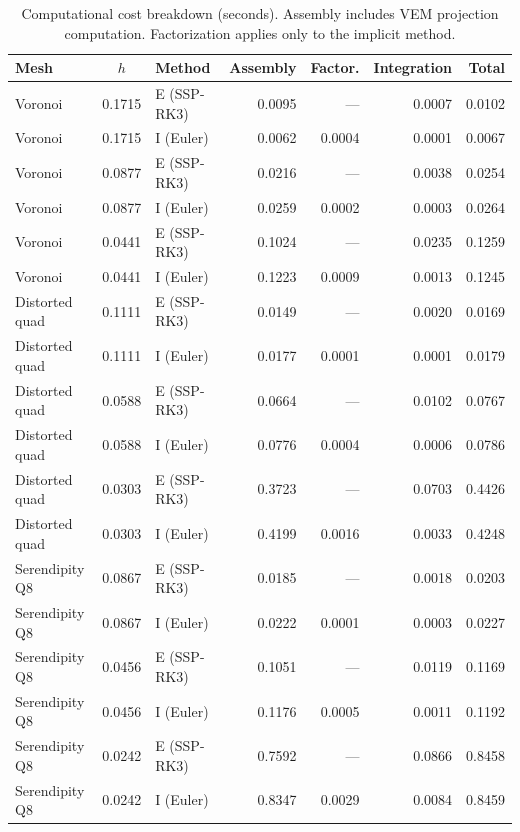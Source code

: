 \documentclass{article}
\begin{document}
\begin{table}[H]
    \centering
    \caption{Computational cost breakdown (seconds). Assembly includes VEM projection computation. Factorization applies only to the implicit method.}\label{tab:cost}
    \begin{tabular}{l c l r r r r}
    \toprule
    Mesh & $h$ & Method & Assembly & Factor. & Integration & Total \\
    \midrule
    Voronoi & 0.1715 & E (SSP-RK3) & 0.0095 & --- & 0.0007 & 0.0102 \\
    Voronoi & 0.1715 & I (Euler) & 0.0062 & 0.0004 & 0.0001 & 0.0067 \\
    Voronoi & 0.0877 & E (SSP-RK3) & 0.0216 & --- & 0.0038 & 0.0254 \\
    Voronoi & 0.0877 & I (Euler) & 0.0259 & 0.0002 & 0.0003 & 0.0264 \\
    Voronoi & 0.0441 & E (SSP-RK3) & 0.1024 & --- & 0.0235 & 0.1259 \\
    Voronoi & 0.0441 & I (Euler) & 0.1223 & 0.0009 & 0.0013 & 0.1245 \\
    \addlinespace
    Distorted quad & 0.1111 & E (SSP-RK3) & 0.0149 & --- & 0.0020 & 0.0169 \\
    Distorted quad & 0.1111 & I (Euler) & 0.0177 & 0.0001 & 0.0001 & 0.0179 \\
    Distorted quad & 0.0588 & E (SSP-RK3) & 0.0664 & --- & 0.0102 & 0.0767 \\
    Distorted quad & 0.0588 & I (Euler) & 0.0776 & 0.0004 & 0.0006 & 0.0786 \\
    Distorted quad & 0.0303 & E (SSP-RK3) & 0.3723 & --- & 0.0703 & 0.4426 \\
    Distorted quad & 0.0303 & I (Euler) & 0.4199 & 0.0016 & 0.0033 & 0.4248 \\
    \addlinespace
    Serendipity Q8 & 0.0867 & E (SSP-RK3) & 0.0185 & --- & 0.0018 & 0.0203 \\
    Serendipity Q8 & 0.0867 & I (Euler) & 0.0222 & 0.0001 & 0.0003 & 0.0227 \\
    Serendipity Q8 & 0.0456 & E (SSP-RK3) & 0.1051 & --- & 0.0119 & 0.1169 \\
    Serendipity Q8 & 0.0456 & I (Euler) & 0.1176 & 0.0005 & 0.0011 & 0.1192 \\
    Serendipity Q8 & 0.0242 & E (SSP-RK3) & 0.7592 & --- & 0.0866 & 0.8458 \\
    Serendipity Q8 & 0.0242 & I (Euler) & 0.8347 & 0.0029 & 0.0084 & 0.8459 \\
    \bottomrule
    \end{tabular}
\end{table}
\end{document}
